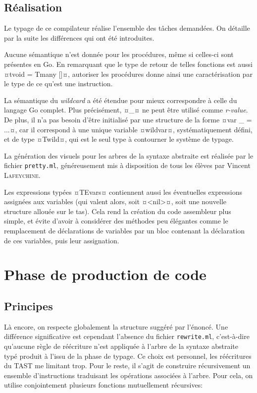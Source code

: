 \documentclass{rapport}
\begin{document}
\subsection{Réalisation}
Le typage de ce compilateur réalise l'ensemble des tâches demandées. On détaille par la suite les différences qui ont été introduites.

Aucune sémantique n'est donnée pour les procédures, même si celles-ci sont présentes en \textsf{Go}. En remarquant que le type de retour de telles fonctions est aussi ¤tvoid = Tmany []¤, autoriser les procédures donne ainsi une caractérisation par le type de ce qu'est une instruction.

La sémantique du \emph{wildcard} a été étendue pour mieux correspondre à celle du langage \textsf{Go} complet. Plus précisément, ¤_¤ ne peut être utilisé comme \emph{r-value}. De plus, il n'a pas besoin d'être initialisé par une structure de la forme ¤var _ = ...¤, car il correspond à une unique variable ¤wildvar¤, systématiquement défini, et de type ¤Twild¤, qui est le seul type à contourner le système de typage.

La génération des visuels pour les arbres de la syntaxe abstraite est réalisée par le fichier \texttt{pretty.ml}, généreusement mis à disposition de tous les élèves par Vincent \textsc{Lafeychine}.

Les expressions typées ¤TEvars¤ contiennent aussi les éventuelles expressions assignées aux variables (qui valent alors, soit ¤<nil>¤, soit une nouvelle structure allouée sur le tas). Cela rend la création du code assembleur plus simple, et évite d'avoir à considérer des méthodes peu élégantes comme le remplacement de déclarations de variables par un bloc contenant la déclaration de ces variables, puis leur assignation.


\section{Phase de production de code}
\subsection{Principes}

Là encore, on respecte globalement la structure suggéré par l'énoncé. Une différence significative est cependant l'absence du fichier \texttt{rewrite.ml}, c'est-à-dire qu'aucune règle de réécriture n'est appliquée à l'arbre de la syntaxe abstraite typé produit à l'issu de la phase de typage. Ce choix est personnel, les réécritures du TAST me limitant trop. Pour le reste, il s'agit de construire récursivement un ensemble d'instructions traduisant les opérations associées à l'arbre. Pour cela, on utilise conjointement plusieurs fonctions mutuellement récursives:
\end{document}
